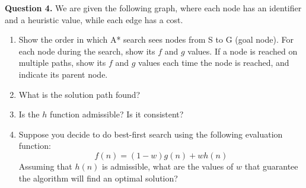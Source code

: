 \documentclass[a4paper,12pt]{article}
\begin{document}
\noindent \textbf{Question 4.} We are given the following graph, where each node has an identifier and a heuristic value, while each edge has a cost.
\begin{center}
\end{center}


\begin{enumerate}
    \item Show the order in which A* search sees nodes from S to G (goal node). For each node during the search, show its $f$ and $g$ values. If a node is reached on multiple paths, show its $f$ and $g$ values each time the node is reached, and indicate its parent node.
    \item What is the solution path found?
    \item Is the $h$ function admissible? Is it consistent?
    \item Suppose you decide to do best-first search using the following evaluation function:
    \begin{equation*}
        f(n) = (1 - w) g(n) + w h(n)
    \end{equation*}
    Assuming that $h(n)$ is admissible, what are the values of $w$ that guarantee the algorithm will find an optimal solution?
\end{enumerate}
\end{document}
